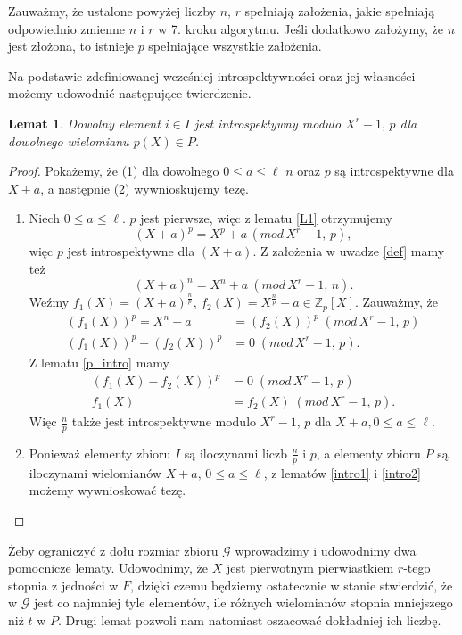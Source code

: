 \documentclass[polish,declaration,shortabstract]{iithesis}
\theoremstyle{definition}
\theoremstyle{remark} \newtheorem{observation}{Obserwacja}
\theoremstyle{plain} \newtheorem{theorem}{Twierdzenie}
\theoremstyle{plain} \newtheorem{lemma}{Lemat}
\theoremstyle{remark} \newtheorem*{remark*}{Uwaga}
\theoremstyle{reminder} \newtheorem*{reminder*}{Przypomnienie}
\begin{document}
Zauważmy, że ustalone powyżej liczby $n, \, r$ spełniają założenia, jakie spełniają odpowiednio zmienne $n$ i $r$ w 7. kroku algorytmu. Jeśli dodatkowo założymy, że $n$ jest złożona, to istnieje $p$ spełniające wszystkie założenia.

Na podstawie zdefiniowanej wcześniej introspektywności oraz jej własności możemy udowodnić następujące twierdzenie.

\begin{lemma}\label{intro}
	Dowolny element $i \in I$ jest introspektywny modulo $X^r - 1, \, p$ dla dowolnego wielomianu $p(X) \in P$.
\end{lemma}
	
\begin{proof}
	Pokażemy, że (1) dla dowolnego $0 \leq a \leq \ell$ $n$ oraz $p$ są introspektywne dla $X + a$, a następnie (2) wywnioskujemy tezę.
	\begin{enumerate}[label=(\arabic*),leftmargin=.4in]
		\item Niech $0 \leq a \leq \ell$. $p$ jest pierwsze, więc z lematu \ref{L1} otrzymujemy \[(X + a)^p = X^p + a \, (mod \, X^r - 1, \, p),\] więc $p$ jest introspektywne dla $(X + a)$. Z założenia w uwadze \ref{def} mamy też  \[(X + a)^n = X^n + a \: (mod \, X^r - 1, \, n).\] Weźmy $f_1(X) = (X + a)^{\frac{n}{p}}, \, f_2(X) = X^{\frac{n}{p}} + a \in \mathbb{Z}_p[X]$. Zauważmy, że 
		      \begin{align*}
		      	(f_1(X))^p = X^n + a    & = (f_2(X))^p \; (mod \, X^r - 1, \, p) \\
		      	(f_1(X))^p - (f_2(X))^p & = 0 \; (mod \, X^r - 1, \, p).         
		      \end{align*}
		      Z lematu \ref{p_intro} mamy
		      \begin{align*}
		      	(f_1(X) - f_2(X))^p & = 0 \; (mod \, X^r - 1, \, p)       \\
		      	f_1(X)              & = f_2(X) \; (mod \, X^r - 1, \, p). 
		      \end{align*}
		      Więc $\frac{n}{p}$ także jest introspektywne modulo $X^r - 1, \, p$ dla $X + a, 0 \leq a \leq \ell$.
		\item Ponieważ elementy zbioru $I$ są iloczynami liczb $\frac{n}{p}$ i $p$, a elementy zbioru $P$ są iloczynami wielomianów $X + a, \, 0 \leq a \leq \ell$, z lematów \ref{intro1} i \ref{intro2} możemy wywnioskować tezę.
	\end{enumerate}
\end{proof} 

Żeby ograniczyć z dołu rozmiar zbioru $\mathcal{G}$ wprowadzimy i udowodnimy dwa pomocnicze lematy. Udowodnimy, że $X$ jest pierwotnym pierwiastkiem $r$-tego stopnia z jedności w $F$, dzięki czemu będziemy ostatecznie w stanie stwierdzić, że w $\mathcal{G}$ jest co najmniej tyle elementów, ile różnych wielomianów stopnia mniejszego niż $t$ w $P$. Drugi lemat pozwoli nam natomiast oszacować dokładniej ich liczbę.
\end{document}
